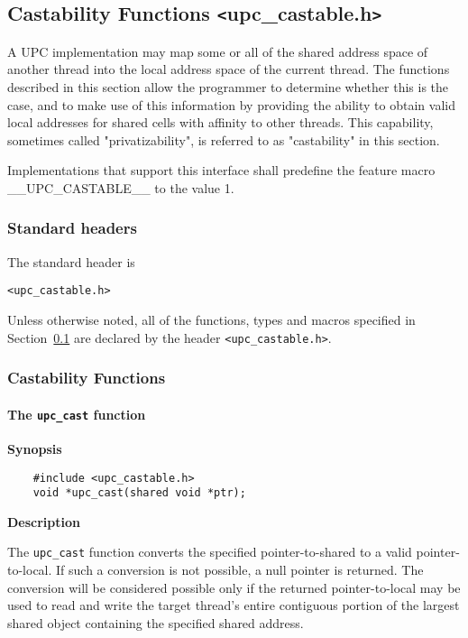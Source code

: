 \subsection{Castability Functions \texttt{<}upc\_castable.h\texttt{>}}
\label{upc-castable}

\npf A UPC implementation may map some or all of the shared address space
of another thread into the local address space of the current thread.  The
functions described in this section allow the programmer to determine
whether this is the case, and to make use of this information by
providing the ability to obtain valid local addresses for shared cells
with affinity to other threads.  This capability, sometimes called
"privatizability", is referred to as "castability" in this section.

\np Implementations that support this interface shall predefine the
feature macro {\_\_UPC\_CASTABLE\_\_} to the value 1.

\subsubsection{Standard headers}

\npf The standard header is

{\tt <upc\_castable.h>}

\np Unless otherwise noted, all of the functions, types and macros
specified in Section~\ref{upc-castable}
are declared by the header {\tt <upc\_castable.h>}.

\subsubsection{Castability Functions}

\paragraph{The {\tt upc\_cast} function}

{\bf Synopsis}

\npf\vspace{-2.5em}
\begin{verbatim}
    #include <upc_castable.h>
    void *upc_cast(shared void *ptr);
\end{verbatim}

{\bf Description}

\np The {\tt upc\_cast} function converts the specified
pointer-to-shared to a valid pointer-to-local.  If such a conversion
is not possible, a null pointer is returned.  The conversion will be considered possible only if the returned
pointer-to-local may be used to read and write the target thread's
entire contiguous portion of the largest shared object
containing the specified shared address.

